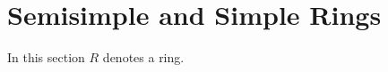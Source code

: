 \section{Semisimple and Simple Rings}


\begin{conventions}
  In this section $R$ denotes a ring.
\end{conventions}











